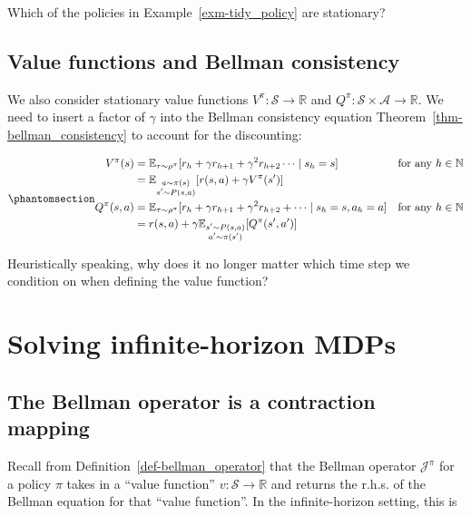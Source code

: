 \documentclass[
  letterpaper,
  DIV=11,
  numbers=noendperiod]{scrreprt}
\theoremstyle{plain}
\theoremstyle{plain}
\theoremstyle{definition}
\theoremstyle{definition}
\theoremstyle{remark}
\begin{document}
Which of the policies in Example~\ref{exm-tidy_policy} are stationary?

\subsection{Value functions and Bellman
consistency}\label{value-functions-and-bellman-consistency}

We also consider stationary value functions
\(V^\pi : \mathcal{S} \to \mathbb{R}\) and
\(Q^\pi : \mathcal{S} \times \mathcal{A} \to \mathbb{R}\). We need to
insert a factor of \(\gamma\) into the Bellman consistency equation
Theorem~\ref{thm-bellman_consistency} to account for the discounting:

\begin{equation}\phantomsection\label{eq-bellman_consistency_infinite}{
\begin{aligned}
    V^\pi(s) &= \mathbb{E}_{\tau \sim \rho^\pi} [r_h+ \gamma r_{h+1} + \gamma^2 r_{h+2} \cdots \mid s_h= s] && \text{for any } h\in \mathbb{N} \\
    &= \mathbb{E}_{\substack{a \sim \pi(s) \\ s' \sim P(s, a)}} [r(s, a) + \gamma V^\pi(s')]\\
    Q^\pi(s, a) &= \mathbb{E}_{\tau \sim \rho^\pi} [r_h+ \gamma r_{h+1} + \gamma^2 r_{h+2} + \cdots \mid s_h= s, a_h= a] && \text{for any } h\in \mathbb{N} \\
    &= r(s, a) + \gamma \mathbb{E}_{\substack{s' \sim P(s, a) \\ a' \sim \pi(s')}} [Q^\pi(s', a')]
\end{aligned}
}\end{equation}

Heuristically speaking, why does it no longer matter which time step we
condition on when defining the value function?

\section{Solving infinite-horizon
MDPs}\label{solving-infinite-horizon-mdps}

\subsection{The Bellman operator is a contraction
mapping}\label{the-bellman-operator-is-a-contraction-mapping}

Recall from Definition~\ref{def-bellman_operator} that the Bellman
operator \(\mathcal{J}^{\pi}\) for a policy \(\pi\) takes in a ``value
function'' \(v : \mathcal{S} \to \mathbb{R}\) and returns the r.h.s. of
the Bellman equation for that ``value function''. In the
infinite-horizon setting, this is
\end{document}
